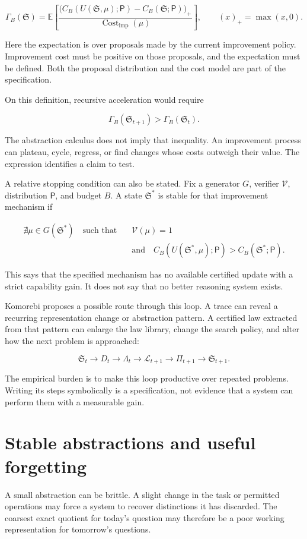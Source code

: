 \documentclass[11pt,oneside,openany]{book}
\begin{document}
\[
\Gamma_B(\mathfrak S)
=\mathbb E\left[
\frac{\bigl(C_B(U(\mathfrak S,\mu);\mathsf P)
-C_B(\mathfrak S;\mathsf P)\bigr)_+}
{\operatorname{Cost}_{\mathrm{imp}}(\mu)}
\right],
\qquad (x)_+=\max(x,0).
\]

Here the expectation is over proposals made by the current improvement policy. Improvement cost must be positive on those proposals, and the expectation must be defined. Both the proposal distribution and the cost model are part of the specification.

On this definition, recursive acceleration would require

\[
\Gamma_B(\mathfrak S_{t+1})>\Gamma_B(\mathfrak S_t).
\]

The abstraction calculus does not imply that inequality. An improvement process can plateau, cycle, regress, or find changes whose costs outweigh their value. The expression identifies a claim to test.

A relative stopping condition can also be stated. Fix a generator \(G\), verifier \(\mathcal V\), distribution \(\mathsf P\), and budget \(B\). A state \(\mathfrak S^*\) is stable for that improvement mechanism if

\[
\begin{aligned}
\nexists\mu\in G(\mathfrak S^*)\quad\text{such that}&\quad\mathcal V(\mu)=1\\
&\quad\text{and}\quad C_B(U(\mathfrak S^*,\mu);\mathsf P)
>C_B(\mathfrak S^*;\mathsf P).
\end{aligned}
\]

This says that the specified mechanism has no available certified update with a strict capability gain. It does not say that no better reasoning system exists.

Komorebi proposes a possible route through this loop. A trace can reveal a recurring representation change or abstraction pattern. A certified law extracted from that pattern can enlarge the law library, change the search policy, and alter how the next problem is approached:

\[
\mathfrak S_t\longrightarrow D_t\longrightarrow\Lambda_t
\longrightarrow\mathscr L_{t+1}\longrightarrow\Pi_{t+1}
\longrightarrow\mathfrak S_{t+1}.
\]

The empirical burden is to make this loop productive over repeated problems. Writing its steps symbolically is a specification, not evidence that a system can perform them with a measurable gain.

\section{Stable abstractions and useful forgetting}
A small abstraction can be brittle. A slight change in the task or permitted operations may force a system to recover distinctions it has discarded. The coarsest exact quotient for today's question may therefore be a poor working representation for tomorrow's questions.
\end{document}
